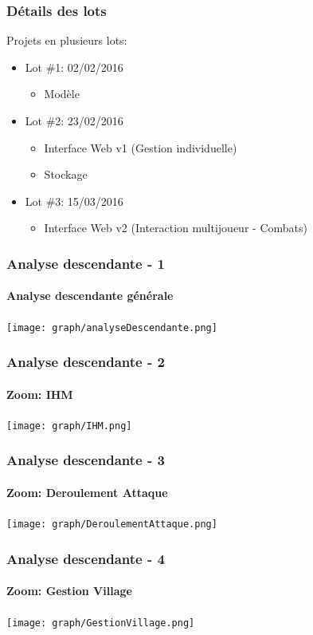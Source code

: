 \documentclass{beamer}
\begin{document}
    \begin{frame}
        \frametitle{D\'etails des lots}
        Projets en plusieurs lots:
        \begin{itemize}
            \item Lot \#1: 02/02/2016\\
                \begin{itemize}
                    \item Modèle
                \end{itemize}
            \item Lot \#2: 23/02/2016
                \begin{itemize}
                    \item Interface Web v1 (Gestion individuelle)
                    \item Stockage
                \end{itemize}
            \item Lot \#3: 15/03/2016
                \begin{itemize}
                    \item Interface Web v2 (Interaction multijoueur - Combats)
                \end{itemize}
        \end{itemize}
    \end{frame}

    \begin{frame}
        \frametitle{Analyse descendante - 1}
        \framesubtitle{Analyse descendante générale}
        \begin{center}
            \texttt{[image: graph/analyseDescendante.png]}
        \end{center}
    \end{frame}
    \begin{frame}
        \frametitle{Analyse descendante - 2}
        \framesubtitle{Zoom: IHM}
        \begin{center}
            \texttt{[image: graph/IHM.png]}
        \end{center}
    \end{frame}
    \begin{frame}
        \frametitle{Analyse descendante - 3}
        \framesubtitle{Zoom: Deroulement Attaque}
        \begin{center}
            \texttt{[image: graph/DeroulementAttaque.png]}
        \end{center}
    \end{frame}
    \begin{frame}
        \frametitle{Analyse descendante - 4}
        \framesubtitle{Zoom: Gestion Village}
        \begin{center}
            \texttt{[image: graph/GestionVillage.png]}
        \end{center}
    \end{frame}
\end{document}
